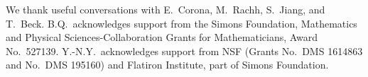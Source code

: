 \documentclass[prb,preprint,showpacs,preprintnumbers,amsmath,amssymb,longbibliography]{revtex4-2}
\begin{document}
\begin{acknowledgments}
We thank useful conversations with E.~Corona, M.~Rachh, S.~Jiang, and
  T.~Beck. B.Q.~acknowledges support from the Simons Foundation,
  Mathematics and Physical Sciences-Collaboration Grants for
  Mathematicians, Award No.~527139. Y.-N.Y.~acknowledges support from
  NSF (Grants No.~DMS 1614863 and No.~DMS 195160) and Flatiron
  Institute, part of Simons Foundation.

\end{acknowledgments}




\end{document}
